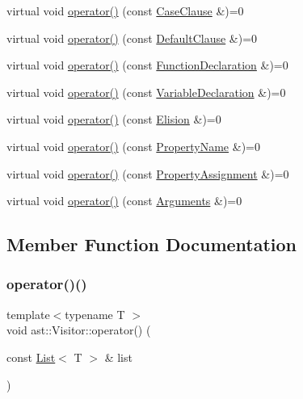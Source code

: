 \begin{DoxyCompactItemize}
\item 
virtual void \hyperlink{structast_1_1_visitor_ac186e6d2b81b0c3237681f9c7b1453a3}{operator()} (const \hyperlink{structast_1_1_case_clause}{Case\+Clause} \&)=0
\item 
virtual void \hyperlink{structast_1_1_visitor_a0daffd46d90c5651f92ece2986413504}{operator()} (const \hyperlink{structast_1_1_default_clause}{Default\+Clause} \&)=0
\item 
virtual void \hyperlink{structast_1_1_visitor_a03209128dc9cb5b49895591361e48c51}{operator()} (const \hyperlink{structast_1_1_function_declaration}{Function\+Declaration} \&)=0
\item 
virtual void \hyperlink{structast_1_1_visitor_ad5cd6d2b05323c913de1d953d876a485}{operator()} (const \hyperlink{structast_1_1_variable_declaration}{Variable\+Declaration} \&)=0
\item 
virtual void \hyperlink{structast_1_1_visitor_aabbc031f1f2593d5054fddf94a32c4ff}{operator()} (const \hyperlink{structast_1_1_elision}{Elision} \&)=0
\item 
virtual void \hyperlink{structast_1_1_visitor_a88d5ae16499478532e9e0249373a8cc4}{operator()} (const \hyperlink{structast_1_1_property_name}{Property\+Name} \&)=0
\item 
virtual void \hyperlink{structast_1_1_visitor_aa8c11e082a0099f7f558b9957378997b}{operator()} (const \hyperlink{structast_1_1_property_assignment}{Property\+Assignment} \&)=0
\item 
virtual void \hyperlink{structast_1_1_visitor_ae1bb70b6440910706372359ac6706283}{operator()} (const \hyperlink{structast_1_1_arguments}{Arguments} \&)=0
\end{DoxyCompactItemize}


\subsection{Member Function Documentation}
\mbox{\label{structast_1_1_visitor_a1e9e80b062c53988c8fdfdcdd1791add}} 
\subsubsection{\texorpdfstring{operator()()}{operator()()}\hspace{0.1cm}{\footnotesize\ttfamily [1/44]}}
{\footnotesize\ttfamily template$<$typename T $>$ \\
void ast\+::\+Visitor\+::operator() (\begin{DoxyParamCaption}\item[{const \hyperlink{structast_1_1_list}{List}$<$ T $>$ \&}]{list }\end{DoxyParamCaption})\hspace{0.3cm}{\ttfamily [inline]}}


